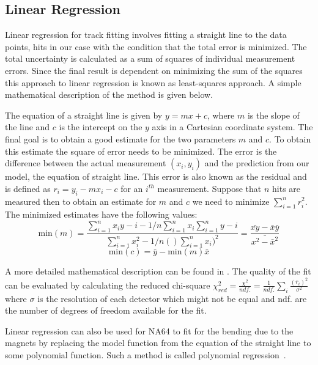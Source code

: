 \subsection{Linear Regression}
\label{sec:Linear_Regression}
Linear regression for track fitting involves fitting a straight line to the data points, hits in our case with the condition that the total error is minimized. The total uncertainty is calculated as a sum of squares of individual measurement errors. Since the final result is dependent on minimizing the sum of the squares this approach to linear regression is known as least-squares approach. A simple mathematical description of the method is given below.

The equation of a straight line is given by $y=mx + c$, where $m$ is the slope of the line and $c$ is the intercept on the $y$ axis in a Cartesian coordinate system. The final goal is to obtain a good estimate for the two parameters $m$ and $c$. To obtain this estimate the square of error needs to be minimized. The error is the difference between the actual measurement $(x_i,y_i)$ and the prediction from our model, the equation of straight line. This error is also known as the residual and is defined as $r_i = y_i - m x_i - c $ for an $i^{th}$ measurement. Suppose that $n$ hits are measured then to obtain an estimate for $m$ and $c$ we need to minimize $\sum_{i=1}^n r_i^2$. The minimized estimates have the following values:
\begin{equation}
      \text{min}(m) = \frac{\sum_{i=1}^n x_i y-i - 1/n \sum_{i=1}^n x_i \sum_{i=1}^n y-i}{\sum_{i=1}^n x_i^2 - 1/n ()\sum_{i=1}^n x_i)^2}  = \frac{\bar{xy} - \bar{x}\bar{y}}{\bar{x^2-\bar{x}^2}}
\end{equation}
\begin{equation}
      \text{min}(c) = \bar{y} - \text{min}(m) \bar{x}
\end{equation}

A more detailed mathematical description can be found in \cite{Linear_regression}. The quality of the fit can be evaluated by calculating the reduced chi-square $\chi^2_{red}=\frac{\chi^2}{ndf.}=\frac{1}{ndf.}\sum_i \frac{(r_i)^2}{\sigma^2}$ where $\sigma$ is the resolution of each detector which might not be equal and ndf. are the number of degrees of freedom available for the fit.

Linear regression can also be used for NA64 to fit for the bending due to the magnets by replacing the model function from the equation of the straight line to some polynomial function. Such a method is called polynomial regression~\cite{STIGLER1974431}.

